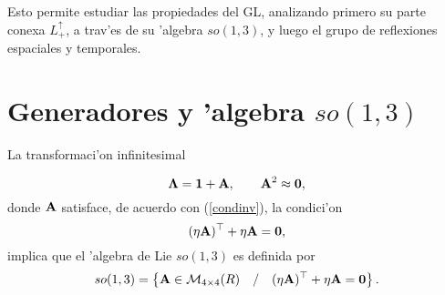 Esto permite estudiar las propiedades del GL, analizando primero su parte
conexa $L_{+}^{\uparrow }$, a trav'es de su 'algebra $so(1,3)$, y
luego el grupo de reflexiones espaciales y temporales.

\section{Generadores y 'algebra $so(1,3)$\label{gene}}

La transformaci'on infinitesimal

\begin{equation}
{\bf \Lambda }={\bf 1+A},\qquad {\bf A}^2\approx {\bf 0}, 
\end{equation}
donde ${\bf A}$ satisface, de acuerdo con (\ref{condinv}), la condici'on 
\begin{equation}
({\bf \eta A})^{\top }+{\bf \eta A}={\bf 0,}  \label{anti1}
\end{equation}
implica que el 'algebra de Lie $so(1,3)$ es definida por 
\begin{equation}
so(1,3)=\left\{ {\bf A}\in {\cal M}_{4\times 4}(R)\quad /\quad ({\bf \eta A}%
)^{\top }+{\bf \eta A}={\bf 0}\right\} .  \label{alg}
\end{equation}

